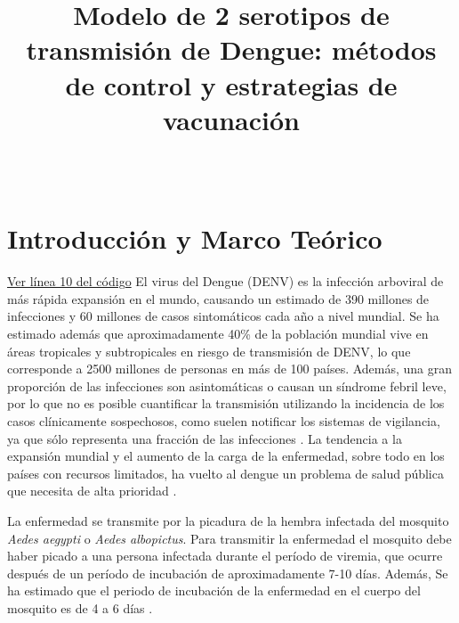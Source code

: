 \documentclass[journal]{IEEEtran}
\begin{document}


\title{Modelo de 2 serotipos de transmisión de Dengue: métodos de control y estrategias de vacunación}
\makeatletter
\let\Title\@title
\makeatother
\author{
\\
}
{\Title}
\maketitle




\section{\textbf{Introducción y Marco Teórico}}  

\href{https://github.com/tuusuario/repositorio/blob/main/genetic_analysis.sh#L10}{Ver línea 10 del código}
El virus del Dengue (DENV) es la infección arboviral de más rápida expansión en el mundo, causando un estimado de 390 millones de infecciones y 60 millones de casos sintomáticos cada año a nivel mundial. Se ha estimado además que aproximadamente 40\% de la población mundial vive en áreas tropicales y subtropicales en riesgo de transmisión de DENV, lo que corresponde a 2500 millones de personas en más de 100 países. Además, una gran proporción de las infecciones son asintomáticas o causan un síndrome febril leve, por lo que no es posible cuantificar la transmisión utilizando la incidencia de los casos clínicamente sospechosos, como suelen notificar los sistemas de vigilancia, ya que sólo representa una fracción de las infecciones \cite{article1}.
La tendencia a la expansión mundial y el aumento de la carga de la enfermedad, sobre todo en los países con recursos limitados, ha vuelto al dengue un problema de salud pública que necesita de alta prioridad \cite{Dengue_Col}.

La enfermedad se transmite por la picadura de la hembra infectada del mosquito \textit{Aedes aegypti} o \textit{Aedes albopictus}. Para transmitir la enfermedad el mosquito debe haber picado a una persona infectada durante el período de viremia, que ocurre después de un período de incubación de aproximadamente 7-10 días. Además, Se ha estimado que el periodo de incubación de la enfermedad en el cuerpo del mosquito es de 4 a 6 días \cite{article}. %
\end{document}
